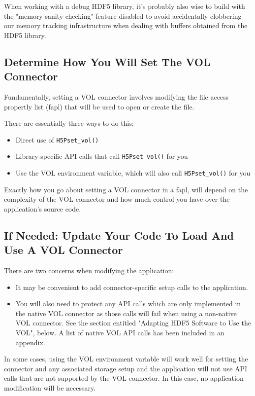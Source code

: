 When working with a debug HDF5 library, it's probably also wise to build with the "memory sanity checking" feature disabled to avoid accidentally clobbering our memory tracking infrastructure when dealing with buffers obtained from the HDF5 library.

\subsection{Determine How You Will Set The VOL Connector}

Fundamentally, setting a VOL connector involves modifying the file access propertly list (fapl) that will be used to open or create the file.

There are essentially three ways to do this:

\begin{itemize}
    \item Direct use of {\tt H5Pset\_vol()}
    \item Library-specific API calls that call {\tt H5Pset\_vol()} for you
    \item Use the VOL environment variable, which will also call {\tt H5Pset\_vol()} for you
\end{itemize}

Exactly how you go about setting a VOL connector in a fapl, will depend on the complexity of the VOL connector and how much control you have over the application's source code.

\subsection{If Needed: Update Your Code To Load And Use A VOL Connector}

There are two concerns when modifying the application:

\begin{itemize}
    \item It may be convenient to add connector-specific setup calls to the application.

    \item You will also need to protect any API calls which are only implemented in the native VOL connector as those calls will fail when using a non-native VOL connector. See the section entitled "Adapting HDF5 Software to Use the VOL", below. A list of native VOL API calls has been included in an appendix.
\end{itemize}

In some cases, using the VOL environment variable will work well for setting the connector and any associated storage setup and the application will not use API calls that are not supported by the VOL connector. In this case, no application modification will be necessary.

